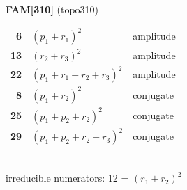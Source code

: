 \documentclass[10pt]{article}
\begin{document}
\begin{minipage}[t]{0.48\textwidth}
{}\\[2mm]\textbf{FAM[310]} (topo310)\\[2pt]{\footnotesize\begin{tabular}{@{}r@{\ \ }l@{\ \ }l@{}}\textbf{6} & $(p_1+r_1)^2$ & amplitude\\
\textbf{13} & $(r_2+r_3)^2$ & amplitude\\
\textbf{22} & $(p_1+r_1+r_2+r_3)^2$ & amplitude\\
\textbf{8} & $(p_1+r_2)^2$ & conjugate\\
\textbf{25} & $(p_1+p_2+r_2)^2$ & conjugate\\
\textbf{29} & $(p_1+p_2+r_2+r_3)^2$ & conjugate\\\end{tabular}}\\[2pt]{\scriptsize irreducible numerators: 12 = $(r_1+r_2)^2$}\end{minipage}\hfill%
\end{document}

